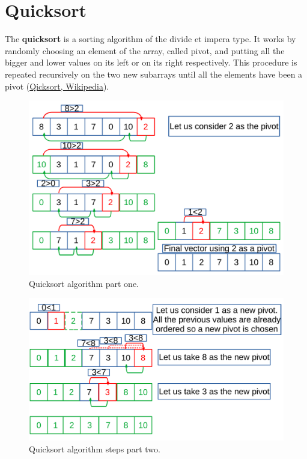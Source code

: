 \section{Quicksort}
The \textbf{quicksort} is a sorting algorithm of the divide et impera type. It works by randomly choosing an element of the array, called pivot, and putting all the bigger and lower values on its left or on its right respectively. This procedure is repeated recursively on the two new subarrays until all the elements have been a pivot \cite{wikiqicksort} (\href{https://en.wikipedia.org/wiki/Quicksort}{Qicksort, Wikipedia}). 
\begin{figure}[H]
	\begin{center}
		\includegraphics[scale=.6]{chapters/searchandsorting/images/sorting_8.pdf}
		\caption[Quicksort algorithm part one.]{Quicksort algorithm part one.}
		\label{sorting_8}
	\end{center}
\end{figure}

\begin{figure}[H]
	\begin{center}
		\includegraphics[scale=.6]{chapters/searchandsorting/images/sorting_9.pdf}
		\caption[Quicksort algorithm steps part two.]{Quicksort algorithm steps part two.}
		\label{sorting_9}
	\end{center}
\end{figure}


